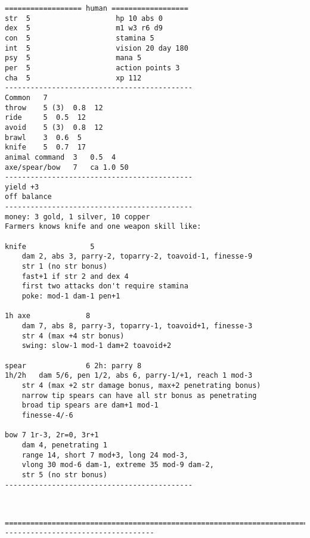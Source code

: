 \goodbreak \begin{samepage} \small \begin{verbatim}
================== human ==================
str  5                    hp 10 abs 0
dex  5                    m1 w3 r6 d9
con  5                    stamina 5
int  5                    vision 20 day 180
psy  5                    mana 5
per  5                    action points 3
cha  5                    xp 112
--------------------------------------------
Common   7
throw    5 (3)	0.8  12
ride     5	0.5  12
avoid    5 (3)	0.8  12
brawl    3	0.6  5
knife    5	0.7  17
animal command  3	0.5  4
axe/spear/bow   7	ca 1.0 50
--------------------------------------------
yield +3
off balance
--------------------------------------------
money: 3 gold, 1 silver, 10 copper
Farmers knows knife and one weapon skill like:

knife               5
	dam 2, abs 3, parry-2, toparry-2, toavoid-1, finesse-9
	str 1 (no str bonus)
	fast+1 if str 2 and dex 4
	first two attacks don't require stamina
	poke: mod-1 dam-1 pen+1

1h axe             8
	dam 7, abs 8, parry-3, toparry-1, toavoid+1, finesse-3
	str 4 (max +4 str bonus)
	swing: slow-1 mod-1 dam+2 toavoid+2

spear              6 2h: parry 8
1h/2h	dam 5/6, pen 1/2, abs 6, parry-1/+1, reach 1 mod-3
	str 4 (max +2 str damage bonus, max+2 penetrating bonus)
	narrow tip spears can have all str bonus as penetrating
	broad tip spears are dam+1 mod-1
	finesse-4/-6

bow	7 1r-3, 2r=0, 3r+1
	dam 4, penetrating 1
	range 14, short 7 mod+3, long 24 mod-3,
	vlong 30 mod-6 dam-1, extreme 35 mod-9 dam-2,
	str 5 (no str bonus)
--------------------------------------------
\end{verbatim} \normalsize \end{samepage}

\







\goodbreak
{}

\goodbreak \begin{samepage} \small \begin{verbatim}
================================================================================
-----------------------------------
\end{verbatim} \normalsize \end{samepage}

